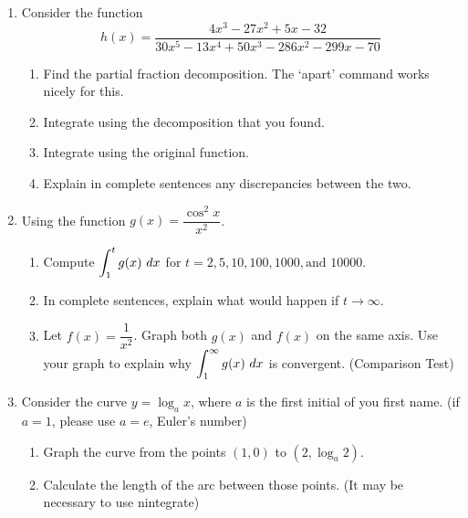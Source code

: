 \documentclass[11pt]{article}
\begin{document}
\begin{enumerate}
\item Consider the function
\[
h(x)=\frac{4x^3-27x^2+5x-32}{30x^5-13x^4+50x^3-286x^2-299x-70}
\]
\begin{enumerate}
\item Find the partial fraction decomposition.  The `apart' command works nicely for this.
\item Integrate using the decomposition that you found.
\item Integrate using the original function.
\item Explain in complete sentences any discrepancies between the two.
\end{enumerate}
\item Using the function $g(x)=\dfrac{\cos^2x}{x^2}$.
\begin{enumerate}
\item Compute $\displaystyle \int_1^t g(x)\ dx$ for $t=2,5,10,100,1000, \text{and } 10000$.
\item In complete sentences, explain what would happen if $t\to\infty$. 
\item Let $f(x)=\dfrac1{x^2}$. Graph both $g(x)$ and $f(x)$ on the same axis.  Use your graph to explain why $\displaystyle \int_1^\infty g(x)\ dx $ is convergent. (Comparison Test)
\end{enumerate}
\item Consider the curve $y=\log_a x$, where $a$ is the first initial of you first name.  (if $a=1$, please use $a=e$, Euler's number)
\begin{enumerate}
\item Graph the curve from the points $(1,0)$ to $(2,\log_a2)$.
\item Calculate the length of the arc between those points.  (It may be necessary to use nintegrate) %
\end{enumerate}
\end{enumerate}
\end{document}
